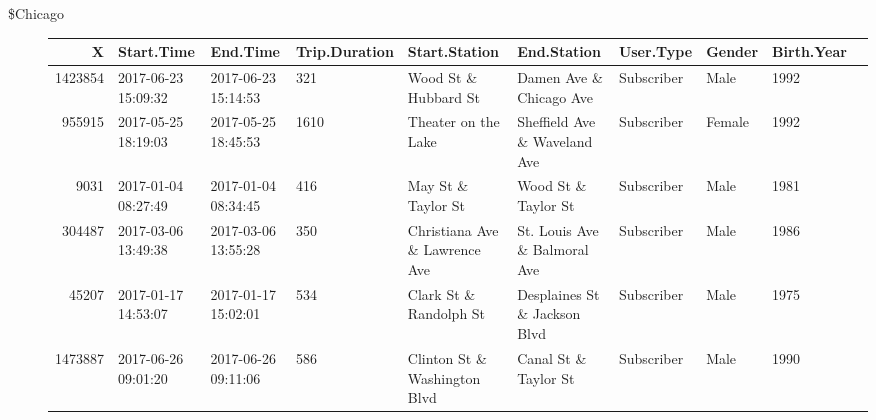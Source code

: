 \documentclass[11pt]{article}
\begin{document}
    \begin{description}
\item[\$Chicago] \begin{tabular}{r|lllllllll}
 X & Start.Time & End.Time & Trip.Duration & Start.Station & End.Station & User.Type & Gender & Birth.Year\\
\hline
	 1423854                                & 2017-06-23 15:09:32                    & 2017-06-23 15:14:53                    &  321                                   & Wood St \& Hubbard St                 & Damen Ave \& Chicago Ave              & Subscriber                             & Male                                   & 1992                                  \\
	  955915                                & 2017-05-25 18:19:03                    & 2017-05-25 18:45:53                    & 1610                                   & Theater on the Lake                    & Sheffield Ave \& Waveland Ave         & Subscriber                             & Female                                 & 1992                                  \\
	    9031                                & 2017-01-04 08:27:49                    & 2017-01-04 08:34:45                    &  416                                   & May St \& Taylor St                   & Wood St \& Taylor St                  & Subscriber                             & Male                                   & 1981                                  \\
	  304487                                & 2017-03-06 13:49:38                    & 2017-03-06 13:55:28                    &  350                                   & Christiana Ave \& Lawrence Ave        & St. Louis Ave \& Balmoral Ave         & Subscriber                             & Male                                   & 1986                                  \\
	   45207                                & 2017-01-17 14:53:07                    & 2017-01-17 15:02:01                    &  534                                   & Clark St \& Randolph St               & Desplaines St \& Jackson Blvd         & Subscriber                             & Male                                   & 1975                                  \\
	 1473887                                & 2017-06-26 09:01:20                    & 2017-06-26 09:11:06                    &  586                                   & Clinton St \& Washington Blvd         & Canal St \& Taylor St                 & Subscriber                             & Male                                   & 1990                                  \\

\end{tabular}
\end{description}
\end{document}
